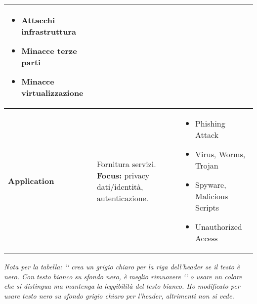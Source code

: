 \begin{table}[H]
\begin{tabular}{|p{}|p{}|p{}|}
\begin{itemize}[nosep, leftmargin=*, itemsep=-2pt, before=\vspace{-0.5\baselineskip}, after=\vspace{-\baselineskip}]
        \item Attacchi infrastruttura
        \item Minacce terze parti
        \item Minacce virtualizzazione
    \end{itemize} \\
\hline
\textbf{Application} & Fornitura servizi. \newline \textbf{Focus:} privacy dati/identità, autenticazione. &
    \begin{itemize}[nosep, leftmargin=*, itemsep=-2pt, before=\vspace{-0.5\baselineskip}, after=\vspace{-\baselineskip}]
        \item Phishing Attack
        \item Virus, Worms, Trojan
        \item Spyware, Malicious Scripts
        \item Unauthorized Access
    \end{itemize} \\
\hline
\end{tabular}
\end{table}
\textit{Nota per la tabella: `` crea un grigio chiaro per la riga dell'header se il testo è nero. Con testo bianco su sfondo nero, è meglio rimuovere `\rowcolor` o usare un colore che si distingua ma mantenga la leggibilità del testo bianco. Ho modificato per usare testo nero su sfondo grigio chiaro per l'header, altrimenti non si vede.}

